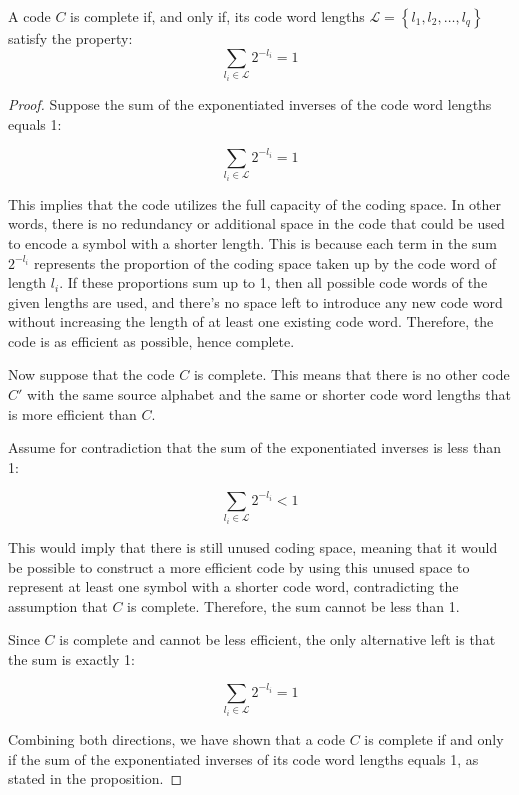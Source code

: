 \begin{proposition}
A code $C$ is complete if, and only if, its code word lengths $\mathcal{L}=\left\{ l_{1},l_{2},\ldots,l_{q}\right\}$ satisfy the property:
\[
\sum_{l_{i}\in\mathcal{L}}2^{-l_{i}} = 1
\]
\end{proposition}
\begin{proof}
Suppose the sum of the exponentiated inverses of the code word lengths equals 1:

\[
\sum_{l_{i}\in\mathcal{L}}2^{-l_{i}} = 1
\]

This implies that the code utilizes the full capacity of the coding space. In other words, there is no redundancy or additional space in the code that could be used to encode a symbol with a shorter length. This is because each term in the sum \( 2^{-l_{i}} \) represents the proportion of the coding space taken up by the code word of length \( l_{i} \). If these proportions sum up to 1, then all possible code words of the given lengths are used, and there's no space left to introduce any new code word without increasing the length of at least one existing code word. Therefore, the code is as efficient as possible, hence complete.

Now suppose that the code \( C \) is complete. This means that there is no other code \( C' \) with the same source alphabet and the same or shorter code word lengths that is more efficient than \( C \).

Assume for contradiction that the sum of the exponentiated inverses is less than 1:

\[
\sum_{l_{i}\in\mathcal{L}}2^{-l_{i}} < 1
\]

This would imply that there is still unused coding space, meaning that it would be possible to construct a more efficient code by using this unused space to represent at least one symbol with a shorter code word, contradicting the assumption that \( C \) is complete. Therefore, the sum cannot be less than 1.

Since \( C \) is complete and cannot be less efficient, the only alternative left is that the sum is exactly 1:

\[
\sum_{l_{i}\in\mathcal{L}}2^{-l_{i}} = 1
\]

Combining both directions, we have shown that a code \( C \) is complete if and only if the sum of the exponentiated inverses of its code word lengths equals 1, as stated in the proposition.

\end{proof}

